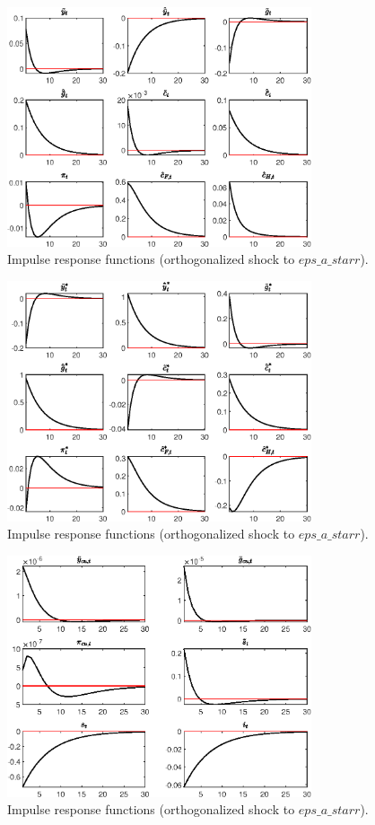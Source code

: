  
\begin{figure}[H]
\centering 
\includegraphics[width=0.80\textwidth]{Model_MAIN_2/graphs/Model_MAIN_2_IRF_eps_a_starr1}
\caption{Impulse response functions (orthogonalized shock to $eps\_a\_starr$).}\label{Fig:IRF:eps_a_starr:1}
\end{figure}
 
\begin{figure}[H]
\centering 
\includegraphics[width=0.80\textwidth]{Model_MAIN_2/graphs/Model_MAIN_2_IRF_eps_a_starr2}
\caption{Impulse response functions (orthogonalized shock to $eps\_a\_starr$).}\label{Fig:IRF:eps_a_starr:2}
\end{figure}
 
\begin{figure}[H]
\centering 
\includegraphics[width=0.80\textwidth]{Model_MAIN_2/graphs/Model_MAIN_2_IRF_eps_a_starr3}
\caption{Impulse response functions (orthogonalized shock to $eps\_a\_starr$).}\label{Fig:IRF:eps_a_starr:3}
\end{figure}
 
 
